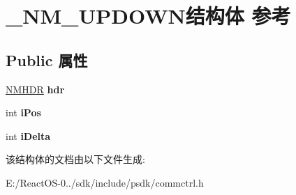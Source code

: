 \hypertarget{struct___n_m___u_p_d_o_w_n}{}\section{\+\_\+\+N\+M\+\_\+\+U\+P\+D\+O\+W\+N结构体 参考}
\label{struct___n_m___u_p_d_o_w_n}
\subsection*{Public 属性}
\begin{DoxyCompactItemize}
\item 
\mbox{\label{struct___n_m___u_p_d_o_w_n_aaf063f77f1def782b4f5380ad8751fd1}} 
\hyperlink{structtag_n_m_h_d_r}{N\+M\+H\+DR} {\bfseries hdr}
\item 
\mbox{\label{struct___n_m___u_p_d_o_w_n_ae1b02fa6d58bcb4e92d14702c2066fac}} 
int {\bfseries i\+Pos}
\item 
\mbox{\label{struct___n_m___u_p_d_o_w_n_a41ec21947aad094e08733d63cd74bbb9}} 
int {\bfseries i\+Delta}
\end{DoxyCompactItemize}


该结构体的文档由以下文件生成\+:\begin{DoxyCompactItemize}
\item 
E\+:/\+React\+O\+S-\/0../sdk/include/psdk/commctrl.\+h\end{DoxyCompactItemize}
